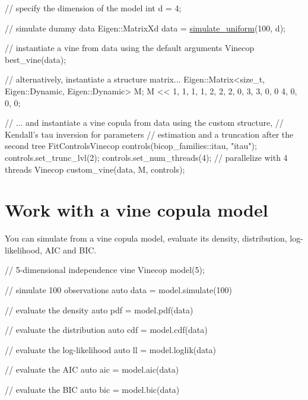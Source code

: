 \begin{DoxyCode}
\textcolor{comment}{// specify the dimension of the model}
\textcolor{keywordtype}{int} d = 4;

\textcolor{comment}{// simulate dummy data}
Eigen::MatrixXd data = \hyperlink{namespacevinecopulib_1_1tools__stats_a4f9a1f8fdbe23db916b013f7f6e500ca}{simulate\_uniform}(100, d);

\textcolor{comment}{// instantiate a vine from data using the default arguments}
Vinecop best\_vine(data);

\textcolor{comment}{// alternatively, instantiate a structure matrix...}
Eigen::Matrix<size\_t, Eigen::Dynamic, Eigen::Dynamic> M;
M << 1, 1, 1, 1,
        2, 2, 2, 0,
        3, 3, 0, 0
        4, 0, 0, 0;

\textcolor{comment}{// ... and instantiate a vine copula from data using the custom structure,}
\textcolor{comment}{// Kendall's tau inversion for parameters}
\textcolor{comment}{// estimation and a truncation after the second tree}
FitControlsVinecop controls(bicop\_families::itau, \textcolor{stringliteral}{"itau"});
controls.set\_trunc\_lvl(2);
controls.set\_num\_threads(4);  \textcolor{comment}{// parallelize with 4 threads}
Vinecop custom\_vine(data, M, controls);
\end{DoxyCode}
\hypertarget{overview-vinecop_vinecop-work}{}\section{Work with a vine copula model}\label{overview-vinecop_vinecop-work}
You can simulate from a vine copula model, evaluate its density, distribution, log-\/likelihood, A\+IC and B\+IC.


\begin{DoxyCode}
\textcolor{comment}{// 5-dimensional independence vine}
Vinecop model(5);

\textcolor{comment}{// simulate 100 observations}
\textcolor{keyword}{auto} data = model.simulate(100)

\textcolor{comment}{// evaluate the density}
\textcolor{keyword}{auto} pdf = model.pdf(data)

\textcolor{comment}{// evaluate the distribution}
\textcolor{keyword}{auto} cdf = model.cdf(data)

\textcolor{comment}{// evaluate the log-likelihood}
\textcolor{keyword}{auto} ll = model.loglik(data)

\textcolor{comment}{// evaluate the AIC}
\textcolor{keyword}{auto} aic = model.aic(data)

\textcolor{comment}{// evaluate the BIC}
\textcolor{keyword}{auto} bic = model.bic(data)
\end{DoxyCode}


